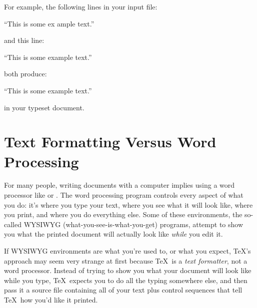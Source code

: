 For example, the following lines in your input file:

\begin{shortexample}
``This                      is some ex%
      ample text.''
\end{shortexample}

and this line:

\begin{shortexample}
``This is some example text.''
\end{shortexample}

both produce:

\begin{exindent}
  \small{``This is some example text.''}
\end{exindent}

in your typeset document.

\section{Text Formatting Versus Word Processing}
\label{sec:textformVSwordproc}

For many people, writing documents with a computer implies using a
word processor like  or .
The word processing program controls
every aspect of what you do: it's where you type your text, where you
see what it will look like, where you print, and where you do
everything else.  Some of these environments, the so-called 
WYSIWYG
(what-you-see-is-what-you-get) programs, attempt to show you what the
printed document will actually look like {\em while\/} you edit
it.

If WYSIWYG environments are what you're used to, or what you expect, \TeX's approach may
seem very strange at first because \TeX\ is 
a {\em text formatter\/},
not a word processor.  Instead of trying to show you what your
document will look like while you type, \TeX\ expects you to do all
the typing somewhere else, and then pass it a source file
containing all of your text plus control sequences that tell
\TeX\ how you'd like it printed.

